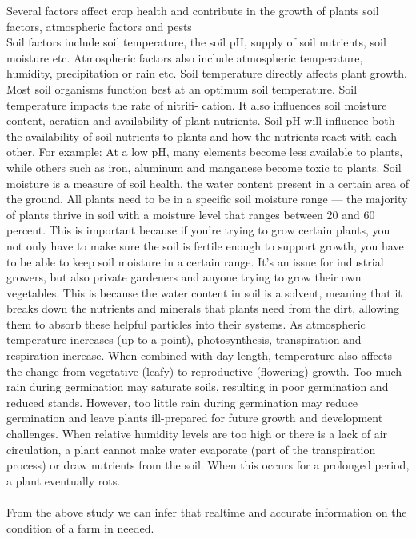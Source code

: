 \documentclass[12pt, a4paper]{article}
\begin{document}
Several factors affect crop health and contribute in the growth of plants soil factors, atmospheric factors and pests\\Soil factors include soil temperature, the soil pH, supply of soil nutrients, soil moisture etc. Atmospheric factors also include atmospheric temperature, humidity, precipitation or rain etc. Soil temperature directly affects plant growth. Most soil organisms function best at an optimum soil temperature. Soil temperature impacts the rate of nitrifi- cation. It also influences soil moisture content, aeration and availability of plant nutrients. Soil pH will influence both the availability of soil nutrients to plants and how the nutrients react with each other. For example: At a low pH, many elements become less available to plants, while others such as iron, aluminum and manganese become toxic to plants. Soil moisture is a measure of soil health, the water content present in a certain area of the ground. All plants need to be in a specific soil moisture range — the majority of plants thrive in soil with a moisture level that ranges between 20 and 60 percent. This is important because if you're trying to grow certain plants, you not only have to make sure the soil is fertile enough to support growth, you have to be able to keep soil moisture in a certain range. It's an issue for industrial growers, but also private gardeners and anyone trying to grow their own vegetables. This is because the water content in soil is a solvent, meaning that it breaks down the nutrients and minerals that plants need from the dirt, allowing them to absorb these helpful particles into their systems. As atmospheric temperature increases (up to a point), photosynthesis, transpiration and respiration increase. When combined with day length, temperature also affects the change from vegetative (leafy) to reproductive (flowering) growth. Too much rain during germination may saturate soils, resulting in poor germination and reduced stands. However, too little rain during germination may reduce germination and leave plants ill-prepared for future growth and development challenges. When relative humidity levels are too high or there is a lack of air circulation, a plant cannot make water evaporate (part of the transpiration process) or draw nutrients from the soil. When this occurs for a prolonged period, a plant eventually rots.\\ \\
From the above study we can infer that realtime and accurate information on the condition of a farm in needed.
\end{document}
